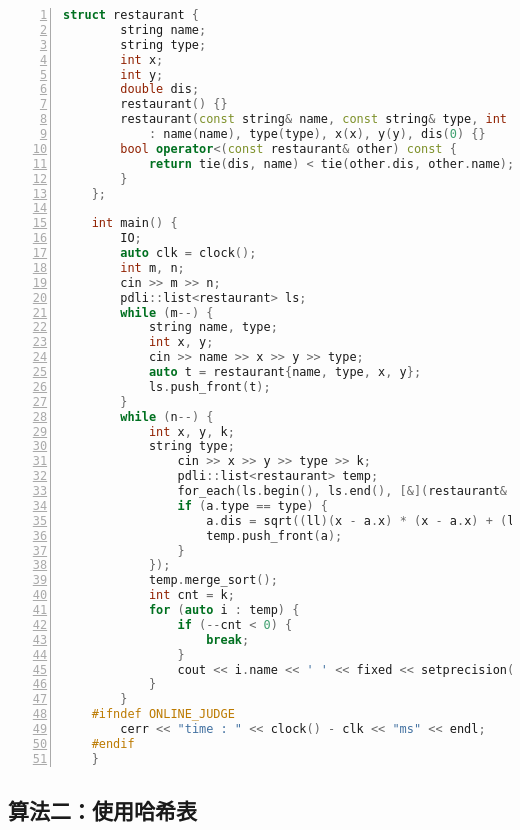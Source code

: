 \documentclass{article}
\begin{document}
\begin{lstlisting}[xleftmargin = 2em,xrightmargin = 2em, aboveskip = 0.5em, numbers = left, language = C++]
    struct restaurant {
        string name;
        string type;
        int x;
        int y;
        double dis;
        restaurant() {}
        restaurant(const string& name, const string& type, int x, int y)
            : name(name), type(type), x(x), y(y), dis(0) {}
        bool operator<(const restaurant& other) const {
            return tie(dis, name) < tie(other.dis, other.name);
        }
    };

    int main() {
        IO;
        auto clk = clock();
        int m, n;
        cin >> m >> n;
        pdli::list<restaurant> ls;
        while (m--) {
            string name, type;
            int x, y;
            cin >> name >> x >> y >> type;
            auto t = restaurant{name, type, x, y};
            ls.push_front(t);
        }
        while (n--) {
            int x, y, k;
            string type;
                cin >> x >> y >> type >> k;
                pdli::list<restaurant> temp;
                for_each(ls.begin(), ls.end(), [&](restaurant& a) {
                if (a.type == type) {
                    a.dis = sqrt((ll)(x - a.x) * (x - a.x) + (ll)(y - a.y) * (y - a.y));
                    temp.push_front(a);
                }
            });
            temp.merge_sort();
            int cnt = k;
            for (auto i : temp) {
                if (--cnt < 0) {
                    break;
                }
                cout << i.name << ' ' << fixed << setprecision(3) << i.dis << endl;
            }
        }
    #ifndef ONLINE_JUDGE
        cerr << "time : " << clock() - clk << "ms" << endl;
    #endif
    }
    \end{lstlisting}

\subsection{算法二：使用哈希表}
\end{document}
